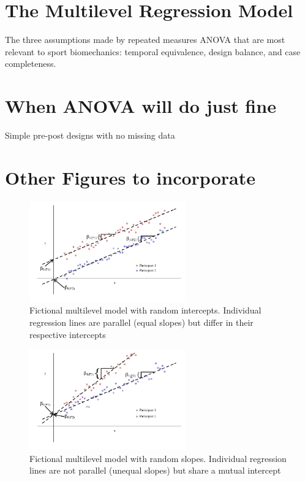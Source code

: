 \documentclass[
]{article}
\begin{document}
\hypertarget{the-multilevel-regression-model}{%
\section{The Multilevel Regression Model}\label{the-multilevel-regression-model}}

The three assumptions made by repeated measures ANOVA that are most relevant to sport biomechanics: temporal equivalence, design balance, and case completeness.

\hypertarget{when-anova-will-do-just-fine}{%
\section{When ANOVA will do just fine}\label{when-anova-will-do-just-fine}}

Simple pre-post designs with no missing data

\hypertarget{other-figures-to-incorporate}{%
\section{Other Figures to incorporate}\label{other-figures-to-incorporate}}

\begin{figure}
\centering
\captionsetup{width=0.6\textwidth}
\includegraphics[width=0.6\textwidth]{rand_int.png}
\caption{Fictional multilevel model with random intercepts. Individual regression lines are parallel (equal slopes) but differ in their respective intercepts}
\label{fig-rand-int}
\end{figure}

\begin{figure}
\centering
\captionsetup{width=0.6\textwidth}
\includegraphics[width=0.6\textwidth]{rand_slope.png}
\caption{Fictional multilevel model with random slopes. Individual regression lines are not parallel (unequal slopes) but share a mutual intercept}
\label{fig-rand-slope}
\end{figure}
\end{document}

